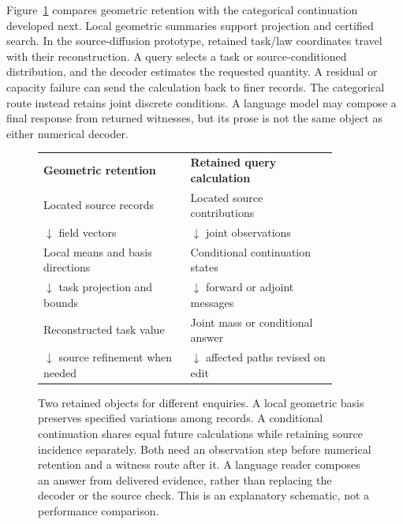 Figure~\ref{fig:dd-memory-mechanism} compares geometric retention with the categorical continuation developed next. Local geometric summaries support projection and certified search. In the source-diffusion prototype, retained task/law coordinates travel with their reconstruction. A query selects a task or source-conditioned distribution, and the decoder estimates the requested quantity. A residual or capacity failure can send the calculation back to finer records. The categorical route instead retains joint discrete conditions. A language model may compose a final response from returned witnesses, but its prose is not the same object as either numerical decoder.
\begin{figure}[htbp]
\centering
\small
\begin{tabular}{p{0.44\linewidth}p{0.44\linewidth}}
\hline
\textbf{Geometric retention} & \textbf{Retained query calculation}\\
Located source records & Located source contributions\\
$\downarrow$ field vectors & $\downarrow$ joint observations\\
Local means and basis directions & Conditional continuation states\\
$\downarrow$ task projection and bounds & $\downarrow$ forward or adjoint messages\\
Reconstructed task value & Joint mass or conditional answer\\
$\downarrow$ source refinement when needed & $\downarrow$ affected paths revised on edit\\
\hline
\end{tabular}
\caption{Two retained objects for different enquiries. A local geometric basis preserves specified variations among records. A conditional continuation shares equal future calculations while retaining source incidence separately. Both need an observation step before numerical retention and a witness route after it. A language reader composes an answer from delivered evidence, rather than replacing the decoder or the source check. This is an explanatory schematic, not a performance comparison.}
\label{fig:dd-memory-mechanism}
\end{figure}

\FloatBarrier
